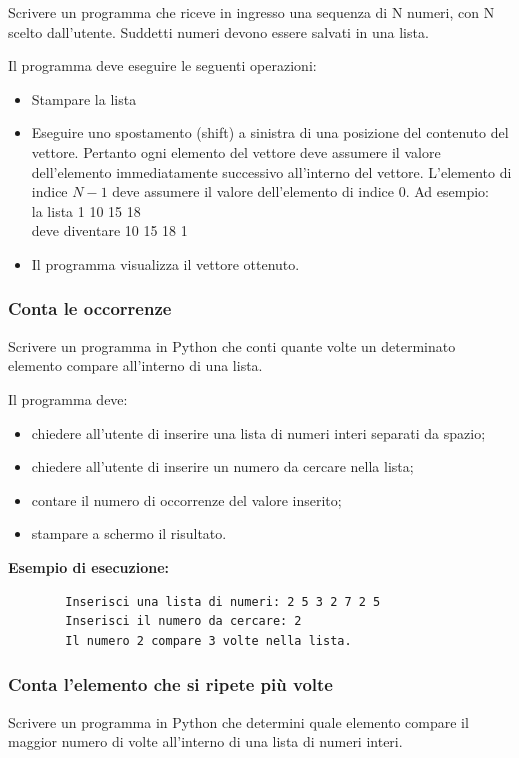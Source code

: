 \documentclass[a4paper,12pt]{article}
\begin{document}
		Scrivere un programma che riceve in ingresso una sequenza di N numeri, con N scelto dall'utente. Suddetti numeri devono essere salvati in una lista.
	
	Il programma deve eseguire le seguenti operazioni:
	
	\begin{itemize}
		\item Stampare la lista
		\item Eseguire uno spostamento (shift) a sinistra di una posizione del contenuto del vettore.
		Pertanto ogni elemento del vettore deve assumere il valore dell’elemento immediatamente successivo all’interno del vettore. L’elemento di indice $N-1$ deve assumere il
		valore dell'elemento di indice $0$.
		Ad esempio: \\ 
		la lista 1 10 15 18 \\
		deve diventare 10 15 18 1
		\item Il programma visualizza il vettore ottenuto.
	\end{itemize}
	
	
	
	\subsubsection{Conta le occorrenze}
	Scrivere un programma in Python che conti quante volte un determinato elemento compare all'interno di una lista.
	
	Il programma deve:
	\begin{itemize}
		\item chiedere all’utente di inserire una lista di numeri interi separati da spazio;
		\item chiedere all’utente di inserire un numero da cercare nella lista;
		\item contare il numero di occorrenze del valore inserito;
		\item stampare a schermo il risultato.
	\end{itemize}
	
	\textbf{Esempio di esecuzione:}
	\begin{verbatim}
		Inserisci una lista di numeri: 2 5 3 2 7 2 5
		Inserisci il numero da cercare: 2
		Il numero 2 compare 3 volte nella lista.
	\end{verbatim}
	
	\subsubsection{Conta l'elemento che si ripete più volte}
	Scrivere un programma in Python che determini quale elemento compare il maggior numero di volte all'interno di una lista di numeri interi.
	
\end{document}

